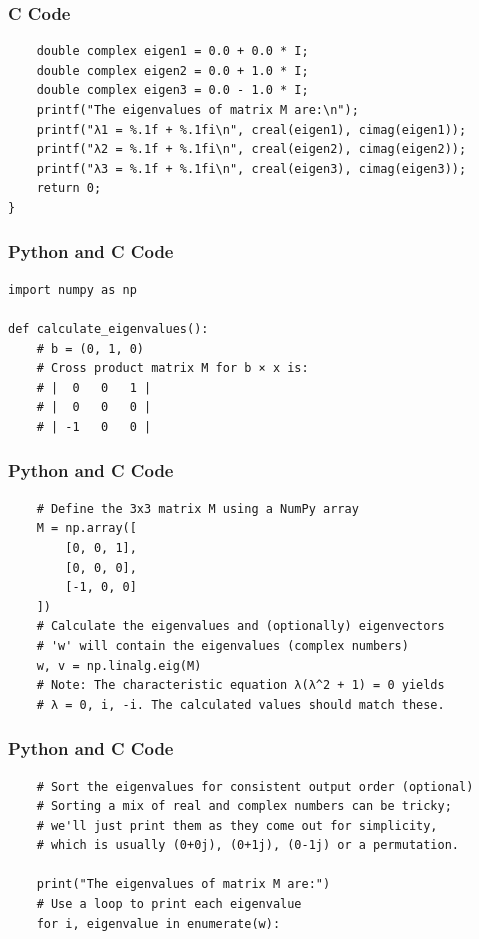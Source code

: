 \documentclass{beamer}
\begin{document}
\begin{frame}[fragile]
\frametitle{C Code}
\begin{lstlisting}
    double complex eigen1 = 0.0 + 0.0 * I;
    double complex eigen2 = 0.0 + 1.0 * I;
    double complex eigen3 = 0.0 - 1.0 * I;
    printf("The eigenvalues of matrix M are:\n");
    printf("λ1 = %.1f + %.1fi\n", creal(eigen1), cimag(eigen1));
    printf("λ2 = %.1f + %.1fi\n", creal(eigen2), cimag(eigen2));
    printf("λ3 = %.1f + %.1fi\n", creal(eigen3), cimag(eigen3));
    return 0;
}
\end{lstlisting}
\end{frame}

\begin{frame}[fragile]
\frametitle{Python and C Code}
\begin{lstlisting}
import numpy as np

def calculate_eigenvalues():
    # b = (0, 1, 0)
    # Cross product matrix M for b × x is:
    # |  0   0   1 |
    # |  0   0   0 |
    # | -1   0   0 |
\end{lstlisting}
\end{frame}

\begin{frame}[fragile]
\frametitle{Python and C Code}
\begin{lstlisting}
    # Define the 3x3 matrix M using a NumPy array
    M = np.array([
        [0, 0, 1],
        [0, 0, 0],
        [-1, 0, 0]
    ])
    # Calculate the eigenvalues and (optionally) eigenvectors
    # 'w' will contain the eigenvalues (complex numbers)
    w, v = np.linalg.eig(M)
    # Note: The characteristic equation λ(λ^2 + 1) = 0 yields 
    # λ = 0, i, -i. The calculated values should match these.
\end{lstlisting}
\end{frame}

\begin{frame}[fragile]
\frametitle{Python and C Code}
\begin{lstlisting}    
    # Sort the eigenvalues for consistent output order (optional)
    # Sorting a mix of real and complex numbers can be tricky; 
    # we'll just print them as they come out for simplicity, 
    # which is usually (0+0j), (0+1j), (0-1j) or a permutation.

    print("The eigenvalues of matrix M are:")
    # Use a loop to print each eigenvalue
    for i, eigenvalue in enumerate(w):
\end{lstlisting}
\end{frame}
\end{document}

